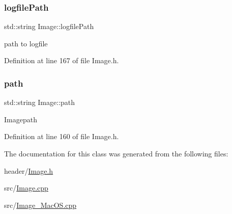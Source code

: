 \subsubsection{\texorpdfstring{logfilePath}{logfilePath}}
{\footnotesize\ttfamily std\+::string Image\+::logfile\+Path\hspace{0.3cm}{\ttfamily [protected]}}

path to logfile 

Definition at line 167 of file Image.\+h.

\mbox{\label{classImage_aec8a33f176362d146da8c058798ebbff}} 
\subsubsection{\texorpdfstring{path}{path}}
{\footnotesize\ttfamily std\+::string Image\+::path\hspace{0.3cm}{\ttfamily [protected]}}

Imagepath 

Definition at line 160 of file Image.\+h.



The documentation for this class was generated from the following files\+:\begin{DoxyCompactItemize}
\item 
header/\mbox{\hyperlink{Image_8h}{Image.\+h}}\item 
src/\mbox{\hyperlink{Image_8cpp}{Image.\+cpp}}\item 
src/\mbox{\hyperlink{Image__MacOS_8cpp}{Image\+\_\+\+Mac\+O\+S.\+cpp}}\end{DoxyCompactItemize}
